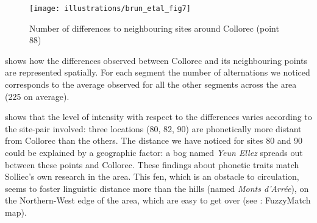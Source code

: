 \documentclass[output=paper]{LSP/langsci}
\begin{document}
\begin{table}
\caption{Number of differences to neighbouring sites around Collorec (site 88)}
\label{tab:8}
\end{table}

\begin{figure}
\texttt{[image: illustrations/brun\_etal\_fig7]}
\caption{Number of differences to neighbouring sites around Collorec (point 88)}
\label{fig:7}
\end{figure}

 shows how the differences observed between Collorec and its neighbouring points are represented spatially. For each segment the number of alternations we noticed corresponds to the average observed for all the other segments across the area (225 on average).

 shows that the level of intensity with respect to the differences varies according to the site-pair involved: three locations (80, 82, 90) are phonetically more distant from Collorec than the others. The distance we have noticed for sites 80 and 90 could be explained by a geographic factor: a bog named \textit{Yeun Ellez} spreads out between these points and Collorec. These findings about phonetic traits match Solliec’s own research in the area. This fen, which is an obstacle to circulation, seems to foster linguistic distance more than the hills (named \textit{Monts d’Arrée}), on the Northern-West edge of the area, which are easy to get over (see : FuzzyMatch map).
\end{document}
